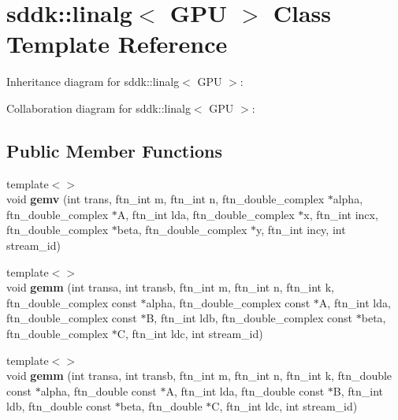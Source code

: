 \hypertarget{classsddk_1_1linalg_3_01_g_p_u_01_4}{}\section{sddk\+:\+:linalg$<$ G\+P\+U $>$ Class Template Reference}
\label{classsddk_1_1linalg_3_01_g_p_u_01_4}


Inheritance diagram for sddk\+:\+:linalg$<$ G\+P\+U $>$\+:


Collaboration diagram for sddk\+:\+:linalg$<$ G\+P\+U $>$\+:
\subsection*{Public Member Functions}
\begin{DoxyCompactItemize}
\item 
\hypertarget{classsddk_1_1linalg_3_01_g_p_u_01_4_a046785f3cf9d00241b6733f97ae8b2d1}{}{\footnotesize template$<$$>$ }\\void {\bfseries gemv} (int trans, ftn\+\_\+int m, ftn\+\_\+int n, ftn\+\_\+double\+\_\+complex $\ast$alpha, ftn\+\_\+double\+\_\+complex $\ast$A, ftn\+\_\+int lda, ftn\+\_\+double\+\_\+complex $\ast$x, ftn\+\_\+int incx, ftn\+\_\+double\+\_\+complex $\ast$beta, ftn\+\_\+double\+\_\+complex $\ast$y, ftn\+\_\+int incy, int stream\+\_\+id)\label{classsddk_1_1linalg_3_01_g_p_u_01_4_a046785f3cf9d00241b6733f97ae8b2d1}

\item 
\hypertarget{classsddk_1_1linalg_3_01_g_p_u_01_4_ae525302a04b94e413398febc55b89d17}{}{\footnotesize template$<$$>$ }\\void {\bfseries gemm} (int transa, int transb, ftn\+\_\+int m, ftn\+\_\+int n, ftn\+\_\+int k, ftn\+\_\+double\+\_\+complex const $\ast$alpha, ftn\+\_\+double\+\_\+complex const $\ast$A, ftn\+\_\+int lda, ftn\+\_\+double\+\_\+complex const $\ast$B, ftn\+\_\+int ldb, ftn\+\_\+double\+\_\+complex const $\ast$beta, ftn\+\_\+double\+\_\+complex $\ast$C, ftn\+\_\+int ldc, int stream\+\_\+id)\label{classsddk_1_1linalg_3_01_g_p_u_01_4_ae525302a04b94e413398febc55b89d17}

\item 
\hypertarget{classsddk_1_1linalg_3_01_g_p_u_01_4_a52ba471574704bd433986aa4db347586}{}{\footnotesize template$<$$>$ }\\void {\bfseries gemm} (int transa, int transb, ftn\+\_\+int m, ftn\+\_\+int n, ftn\+\_\+int k, ftn\+\_\+double const $\ast$alpha, ftn\+\_\+double const $\ast$A, ftn\+\_\+int lda, ftn\+\_\+double const $\ast$B, ftn\+\_\+int ldb, ftn\+\_\+double const $\ast$beta, ftn\+\_\+double $\ast$C, ftn\+\_\+int ldc, int stream\+\_\+id)\label{classsddk_1_1linalg_3_01_g_p_u_01_4_a52ba471574704bd433986aa4db347586}


\end{DoxyCompactItemize}
